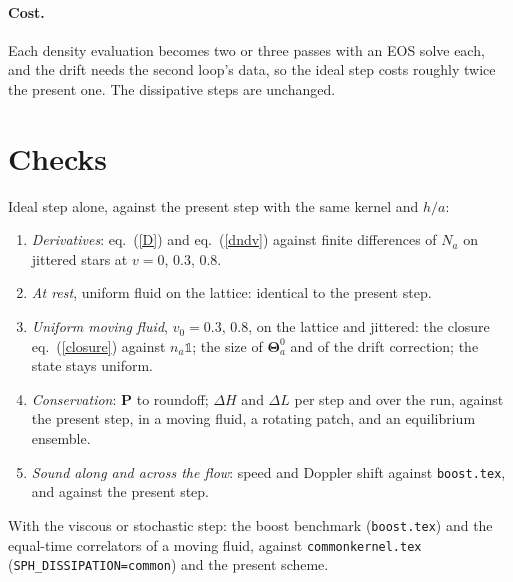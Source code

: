 \documentclass[11pt,aps,preprint,nofootinbib,superscriptaddress,tightenlines]{revtex4-2}
\def\Eq#1{eq.~(\ref{#1})}
\newcommand{\one}{\mathds{1}}
\let\oldparagraph\paragraph
\renewcommand{\paragraph}{\par\bigskip\oldparagraph}
\begin{document}
\paragraph{Cost.}  Each density evaluation becomes two or three passes with an EOS solve each, and the drift needs the second loop's
data, so the ideal step costs roughly twice the present one.  The dissipative steps are unchanged.

\section{Checks}
\label{sec:checks}

Ideal step alone, against the present step with the same kernel and $h/a$:
\begin{enumerate}
\item \emph{Derivatives}: \Eq{D} and \Eq{dndv} against finite differences of $N_a$ on jittered stars at $v=0$, $0.3$, $0.8$.
\item \emph{At rest}, uniform fluid on the lattice: identical to the present step.
\item \emph{Uniform moving fluid}, $v_0=0.3$, $0.8$, on the lattice and jittered: the closure \Eq{closure} against $n_a\one$; the size of
  $\bm\Theta^0_a$ and of the drift correction; the state stays uniform.
\item \emph{Conservation}: $\bm P$ to roundoff; $\Delta H$ and $\Delta L$ per step and over the run, against the present step, in a moving
  fluid, a rotating patch, and an equilibrium ensemble.
\item \emph{Sound along and across the flow}: speed and Doppler shift against \texttt{boost.tex}, and against the present step.
\end{enumerate}
With the viscous or stochastic step: the boost benchmark (\texttt{boost.tex}) and the equal-time correlators of a moving fluid, against
\texttt{commonkernel.tex} (\texttt{SPH\_DISSIPATION=common}) and the present scheme.
\end{document}
